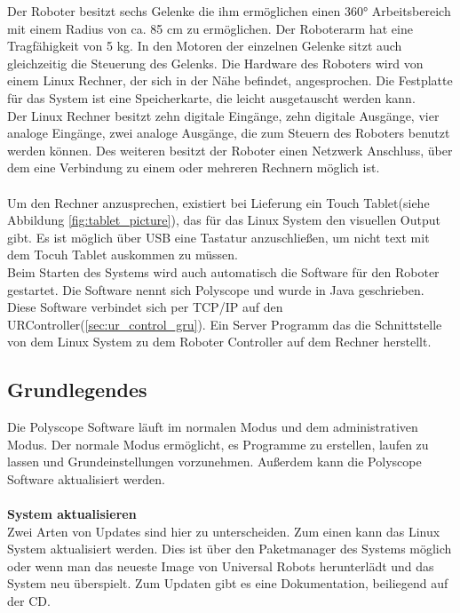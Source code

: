 Der Roboter besitzt sechs Gelenke die ihm ermöglichen einen 360° Arbeitsbereich mit einem Radius von ca. 85 cm zu ermöglichen. Der Roboterarm hat eine Tragfähigkeit von 5 kg. In den Motoren der einzelnen Gelenke sitzt auch gleichzeitig die Steuerung des Gelenks. Die Hardware des Roboters wird von einem Linux Rechner, der sich in der Nähe befindet, angesprochen.
Die Festplatte für das System ist eine Speicherkarte, die leicht ausgetauscht werden kann.\\
Der Linux Rechner besitzt zehn digitale Eingänge, zehn digitale Ausgänge, vier analoge Eingänge, zwei analoge Ausgänge, die zum Steuern des Roboters benutzt werden können. Des weiteren besitzt der Roboter einen Netzwerk Anschluss, über dem eine Verbindung zu einem oder mehreren Rechnern möglich ist.
\\\\
Um den Rechner anzusprechen, existiert bei Lieferung ein Touch Tablet(siehe Abbildung \ref{fig:tablet_picture}), das für das Linux System den visuellen Output gibt. Es ist möglich über USB eine Tastatur anzuschließen, um nicht text mit dem Tocuh Tablet auskommen zu müssen. 
\\
Beim Starten des Systems wird auch automatisch die Software für den Roboter gestartet. Die Software nennt sich Polyscope und wurde in Java geschrieben. Diese Software verbindet sich per \ac{TCP/IP} auf den URController(\ref{sec:ur_control_gru}). Ein Server Programm das die Schnittstelle von dem Linux System zu dem Roboter Controller auf dem Rechner herstellt.

\subsection{Grundlegendes}
\label{sub:ur_update_gru}

Die Polyscope Software läuft im normalen Modus und dem administrativen Modus. Der normale Modus ermöglicht, es Programme zu erstellen, laufen zu lassen und Grundeinstellungen vorzunehmen. Außerdem kann die Polyscope Software aktualisiert werden.
\\\\
\textbf{System aktualisieren}\\
Zwei Arten von Updates sind hier zu unterscheiden. Zum einen kann das Linux System aktualisiert werden. Dies ist über den Paketmanager des Systems möglich oder wenn man das neueste Image von Universal Robots herunterlädt und das System neu überspielt. Zum Updaten gibt es eine Dokumentation, beiliegend auf der CD.

